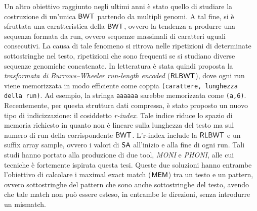 \documentclass[a4paper,11pt, oneside,italian]{article}
\def\SA{\mbox{\rm {\sf SA}}}
\def\RLBWT{\mbox{\rm {\sf RLBWT}}}
\def\MEM{\mbox{\rm {\sf MEM}}}
\def\BWT{\mbox{\rm {\sf BWT}}}
\begin{document}
Un altro obiettivo raggiunto negli ultimi anni è stato quello di studiare la
costruzione di un'unica $\BWT$ partendo da multipli genomi.
A tal fine, si è sfruttata una caratteristica della $\BWT$, ovvero la
tendenza a produrre una sequenza formata da run, ovvero sequenze massimali
di caratteri uguali consecutivi. La causa di tale fenomeno si ritrova nelle
ripetizioni di 
determinate sottostringhe nel testo, ripetizioni che sono frequenti se si
studiano diverse sequenze genomiche concatenate.
%
In letteratura è stata quindi proposta la \textit{trasformata di
  Burrows--Wheeler 
  run-length encoded} ($\RLBWT$), dove ogni run viene memorizzata in modo
efficiente 
come coppia \texttt{(carattere, lunghezza della run)}. Ad esempio, la stringa
\texttt{aaaaaa} sarebbe memorizzata come \texttt{(a,6)}.
Recentemente, per questa struttura dati compressa, è stato proposto un nuovo
tipo di indicizzazione: il cosiddetto \textit{r-index}. Tale indice riduce lo
spazio di memoria richiesto in quanto non è lineare sulla lunghezza del testo ma
sul numero di run della corrispondente $\BWT$.
L'r-index include la
$\RLBWT$ e un suffix array sample, ovvero i valori di $\SA$ all’inizio e alla
fine di ogni run. 
Tali studi hanno portato alla produzione di due tool, \textit{MONI} e 
\textit{PHONI}, alle cui tecniche è fortemente ispirata questa tesi. Queste due
soluzioni hanno entrambe l'obiettivo di 
calcolare i maximal exact match ($\MEM$) tra un testo e un pattern, ovvero
sottostringhe del pattern che 
sono anche sottostringhe del testo, avendo che tale match non può essere esteso,
in entrambe le direzioni, senza introdurre un mismatch. 
\end{document}
